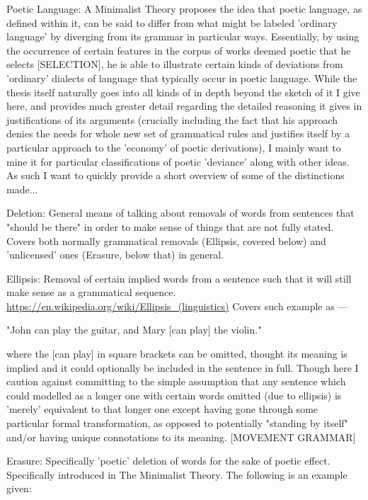 \documentclass[]{article}
\begin{document}
Poetic Language: A Minimalist Theory proposes the idea that poetic language, as defined within it, can be said to differ from what might be labeled 'ordinary language' by diverging from its grammar in particular ways. Essentially, by using the occurrence of certain features in the corpus of works deemed poetic that he selects [SELECTION], he is able to illustrate certain kinds of deviations from 'ordinary' dialects of language that typically occur in poetic language. While the thesis itself naturally goes into all kinds of in depth beyond the sketch of it I give here, and provides much greater detail regarding the detailed reasoning it gives in justifications of its arguments (crucially including the fact that his approach denies the needs for whole new set of grammatical rules and justifies itself by a particular approach to the 'economy' of poetic derivations), I mainly want to mine it for particular classifications of poetic 'deviance' along with other ideas. As such I want to quickly provide a short overview of some of the distinctions made...



Deletion: General means of talking about removals of words from sentences that "should be there" in order to make sense of things that are not fully stated. Covers both normally grammatical removals (Ellipsis, covered below) and 'unlicensed' ones (Erasure, below that) in general.



Ellipsis: Removal of certain implied words from a sentence such that it will still make sense as a grammatical sequence. \url{https://en.wikipedia.org/wiki/Ellipsis_(linguistics)} Covers such example as —

"John can play the guitar, and Mary [can play] the violin."

where the [can play] in square brackets can be omitted, thought its meaning is implied and it could optionally be included in the sentence in full. Though here I caution against committing to the simple assumption that any sentence which could modelled as a longer one with certain words omitted (due to ellipsis) is 'merely' equivalent to that longer one except having gone through some particular formal transformation, as opposed to potentially "standing by itself" and/or having unique connotations to its meaning. [MOVEMENT GRAMMAR]



Erasure: Specifically 'poetic' deletion of words for the sake of poetic effect. Specifically introduced in The Minimalist Theory. The following is an example given:
\end{document}
